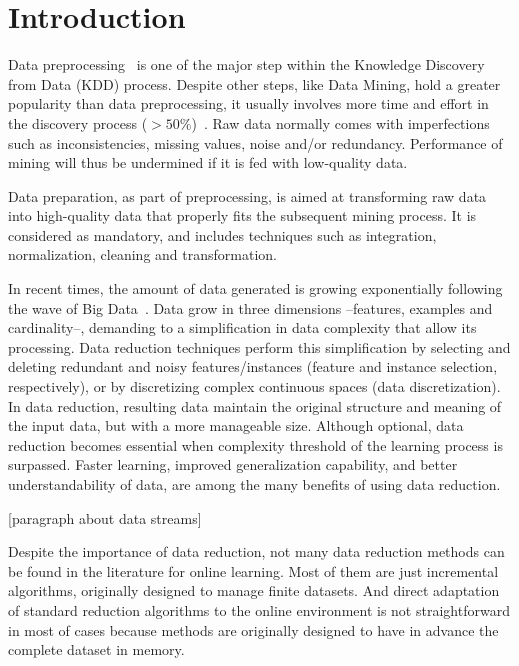 \documentclass[preprint,12pt]{elsarticle}
\begin{document}

\section{Introduction}
\label{sec:intro}


Data preprocessing~\cite{garcia14} is one of the major step within the Knowledge Discovery from Data (KDD) process. Despite other steps, like Data Mining, hold a greater popularity than data preprocessing, it usually involves more time and effort in the discovery process ($> 50\%$)~\cite{pyle99}. Raw data normally comes with imperfections such as inconsistencies, missing values, noise and/or redundancy. Performance of mining will thus be undermined if it is fed with low-quality data.

Data preparation, as part of preprocessing, is aimed at transforming raw data into high-quality data that properly fits the subsequent mining process. It is considered as mandatory, and includes techniques such as integration, normalization, cleaning and transformation.

In recent times, the amount of data generated is growing exponentially following the wave of Big Data~\cite{mayer13}. Data grow in three dimensions --features, examples and cardinality--, demanding to a simplification in data complexity that allow its processing. Data reduction techniques perform this simplification by selecting and deleting redundant and noisy features/instances (feature and instance selection, respectively), or by discretizing complex continuous spaces (data discretization). In data reduction, resulting data maintain the original structure and meaning of the input data, but with a more manageable size. Although optional, data reduction becomes essential when complexity threshold of the learning process is surpassed. Faster learning, improved generalization capability, and better understandability of data, are among the many benefits of using data reduction. 

[paragraph about data streams]

Despite the importance of data reduction, not many data reduction methods can be found in the literature for online learning. Most of them are just incremental algorithms, originally designed to manage finite datasets. And direct adaptation of standard reduction algorithms to the online environment is not straightforward in most of cases because methods are originally designed to have in advance the complete dataset in memory. 
\end{document}
